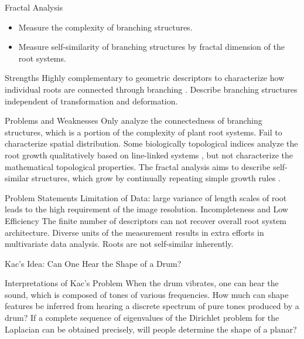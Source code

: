 \documentclass{article}
\begin{document}
\begin{outline}[enumerate]
       \4 Fractal Analysis \cite{tatsumi1989fractal}
         \begin{itemize}
            \item Measure the complexity of branching structures.
            \item Measure self-similarity of branching structures by fractal dimension of the root systems.
         \end{itemize}

     \3 Strengths
       \4 Highly complementary to geometric descriptors to characterize how individual roots are connected through branching \cite{delory2018archidart}.
       \4 Describe branching structures independent of transformation and deformation.

     \3 Problems and Weaknesses
       \4 Only analyze the connectedness of branching structures, which is a portion of the complexity of plant root systems.
       \4 Fail to characterize spatial distribution.
       \4 Some biologically topological indices analyze the root growth qualitatively based on line-linked systems \cite{fitter1986topology}, but not characterize the mathematical topological properties.
       \4 The fractal analysis aims to describe self-similar structures, which grow by continually repeating simple growth rules \cite{fitter1992fractal}.

  \1 Problem Statements
    \2 Limitation of Data: large variance of length scales of root leads to the high requirement of the image resolution.
    \2 Incompleteness and Low Efficiency
      \3 The finite number of descriptors can not recover overall root system architecture.
      \3 Diverse units of the measurement results in extra efforts in multivariate data analysis.
      \3 Roots are not self-similar inherently.






 
  \newpage
      

  \1 Kac’s Idea: Can One Hear the Shape of a Drum? \cite{kac1966can}
  
    \2 Interpretations of Kac's Problem
      \3 When the drum vibrates, one can hear the sound, which is composed of tones of various frequencies. How much can shape features be inferred from hearing a discrete spectrum of pure tones produced by a drum?
      \3 If a complete sequence of eigenvalues of the Dirichlet problem for the Laplacian can be obtained precisely, will people determine the shape of a planar?
      

\end{outline}
\end{document}
